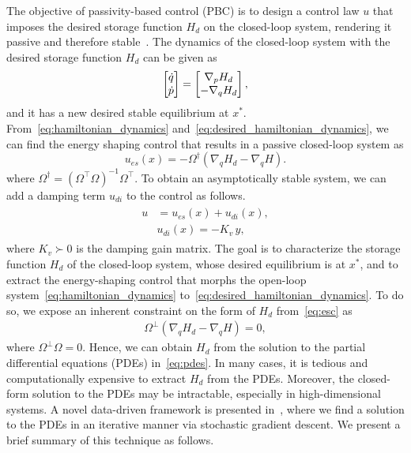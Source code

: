 The objective of passivity-based control (PBC) is to design a control law $u$
that imposes the desired storage function $H_d$ on the closed-loop system,
rendering it passive and therefore stable~\cite{van2000l2}.
%
The dynamics of the closed-loop system with the desired storage function $H_d$ can be given as
\begin{align}
  \begin{split}  
    \begin{bmatrix}\dot{q} \\ \dot{p}\end{bmatrix} &= \begin{bmatrix}\nabla_pH_d \\ -\nabla_qH_d\end{bmatrix}, \\
  \end{split}
  \label{eq:desired_hamiltonian_dynamics}
\end{align}
\noindent and it has a new desired stable equilibrium at $x^*$.
%
From~\eqref{eq:hamiltonian_dynamics}
and~\eqref{eq:desired_hamiltonian_dynamics}, we can find the energy shaping
control that results in a passive closed-loop system as
%
\begin{equation}
  u_{es}(x) =  -\Omega^{\dagger} \left( \nabla_q H_d - \nabla_q H \right).
  \label{eq:esc}
\end{equation}
\noindent where $\Omega^\dagger = \left( \Omega^\top \Omega  \right)^{-1}
\Omega^\top$. To obtain an asymptotically stable system, we can add a
damping term $u_{di}$ to the control as follows.
\begin{align}
  \begin{split} 
    u &= u_{es}(x) + u_{di}(x), \\
    &u_{di}(x) = - K_{v} \, y,
  \end{split}
  \label{eq:damping_and_es_control}
\end{align}
\noindent where $K_v \succ 0$ is the damping gain matrix.
%
The goal is to characterize the storage function $H_d$ of the closed-loop
system, whose desired equilibrium is at $x^*$, and to extract the energy-shaping
control that morphs the open-loop system~\eqref{eq:hamiltonian_dynamics}
to~\eqref{eq:desired_hamiltonian_dynamics}.
%
To do so, we expose an inherent constraint on the form of $H_d$ from~\eqref{eq:esc} as
\begin{align}
  \Omega^\bot \left( \nabla_q H_d - \nabla_q H \right) = 0,
    \label{eq:pdes}
\end{align}
where $\Omega^\perp \Omega = 0$. 
%
Hence, we can obtain $H_d$ from the solution to the partial differential
equations (PDEs) in~\eqref{eq:pdes}.
%
In many cases, it is tedious and computationally expensive to extract $H_d$ from
the PDEs. Moreover, the closed-form solution to the PDEs may be intractable,
especially in high-dimensional systems.
%
A novel data-driven framework is presented in~\cite{ashenafi2022robust,
sirichotiyakul2022data, acc}, where we find a solution to the PDEs in an
iterative manner via stochastic gradient descent.
%
We present a brief summary of this technique as follows.

